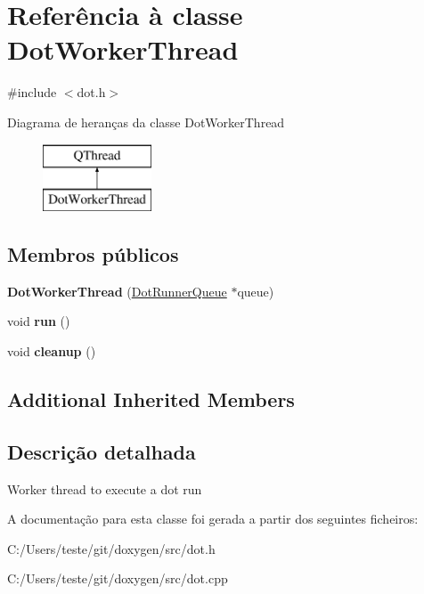 \hypertarget{class_dot_worker_thread}{\section{Referência à classe Dot\-Worker\-Thread}
\label{class_dot_worker_thread}
}


{\ttfamily \#include $<$dot.\-h$>$}

Diagrama de heranças da classe Dot\-Worker\-Thread\begin{figure}[H]
\begin{center}
\leavevmode
\includegraphics[height=2.000000cm]{class_dot_worker_thread}
\end{center}
\end{figure}
\subsection*{Membros públicos}
\begin{DoxyCompactItemize}
\item 
\hypertarget{class_dot_worker_thread_a4b58057d8c8426cb6e14e64c9c1fcafe}{{\bfseries Dot\-Worker\-Thread} (\hyperlink{class_dot_runner_queue}{Dot\-Runner\-Queue} $\ast$queue)}\label{class_dot_worker_thread_a4b58057d8c8426cb6e14e64c9c1fcafe}

\item 
\hypertarget{class_dot_worker_thread_a13a43e6d814de94978c515cb084873b1}{void {\bfseries run} ()}\label{class_dot_worker_thread_a13a43e6d814de94978c515cb084873b1}

\item 
\hypertarget{class_dot_worker_thread_a4b66d5e31b5dc18b314c8a68163263bd}{void {\bfseries cleanup} ()}\label{class_dot_worker_thread_a4b66d5e31b5dc18b314c8a68163263bd}

\end{DoxyCompactItemize}
\subsection*{Additional Inherited Members}


\subsection{Descrição detalhada}
Worker thread to execute a dot run 

A documentação para esta classe foi gerada a partir dos seguintes ficheiros\-:\begin{DoxyCompactItemize}
\item 
C\-:/\-Users/teste/git/doxygen/src/dot.\-h\item 
C\-:/\-Users/teste/git/doxygen/src/dot.\-cpp\end{DoxyCompactItemize}

